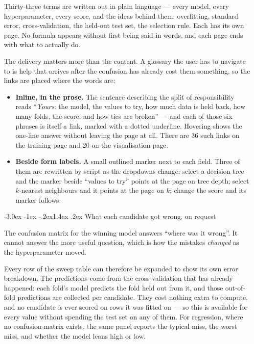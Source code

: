 \documentclass[11pt,a4paper]{article}
\makeatletter
\renewcommand\subsection{\@startsection{subsection}{2}{\z@}%
  {-3.0ex \@plus -1ex \@minus -.2ex}{1.4ex \@plus .2ex}%
  {\normalfont\large\sffamily\bfseries\color{accent}}}
\makeatother
\begin{document}
Thirty-three terms are written out in plain language --- every model, every
hyperparameter, every score, and the ideas behind them: overfitting, standard
error, cross-validation, the held-out test set, the selection rule. Each has its
own page. No formula appears without first being said in words, and each page
ends with what to actually do.

The delivery matters more than the content. A glossary the user has to navigate
to is help that arrives after the confusion has already cost them something, so
the links are placed where the words are:

\begin{itemize}
\item \textbf{Inline, in the prose.} The sentence describing the split of
responsibility reads ``\emph{Yours}: the model, the values to try, how much data
is held back, how many folds, the score, and how ties are broken'' --- and each
of those six phrases is itself a link, marked with a dotted underline. Hovering
shows the one-line answer without leaving the page at all. There are 36 such
links on the training page and 20 on the visualisation page.

\item \textbf{Beside form labels.} A small outlined marker next to each field.
Three of them are rewritten by script as the dropdowns change: select a decision
tree and the marker beside ``values to try'' points at the page on tree depth;
select $k$-nearest neighbours and it points at the page on $k$; change the score
and its marker follows.
\end{itemize}

\subsection{What each candidate got wrong, on request}

The confusion matrix for the winning model answers ``where was it wrong''. It
cannot answer the more useful question, which is how the mistakes \emph{changed}
as the hyperparameter moved.

Every row of the sweep table can therefore be expanded to show its own error
breakdown. The predictions come from the cross-validation that has already
happened: each fold's model predicts the fold held out from it, and those
out-of-fold predictions are collected per candidate. They cost nothing extra to
compute, and no candidate is ever scored on rows it was fitted on --- so this is
available for every value without spending the test set on any of them. For
regression, where no confusion matrix exists, the same panel reports the typical
miss, the worst miss, and whether the model leans high or low.
\end{document}
